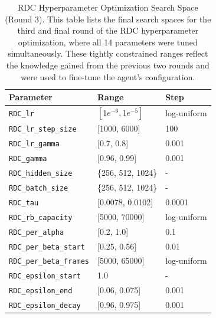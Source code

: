 \begin{table}[!htb]
    \centering
    \begin{tabular}{lll}
        \toprule
        \textbf{Parameter} & \textbf{Range} & \textbf{Step} \\
        \midrule
        \texttt{RDC\_lr}                 & $[1e^{-6}, 1e^{-5}]$      & log-uniform \\
        \texttt{RDC\_lr\_step\_size}     & [1000, 6000]               & 100 \\
        \texttt{RDC\_lr\_gamma}          & [0.7, 0.8]              & 0.001 \\
        \texttt{RDC\_gamma}              & [0.96, 0.99]              & 0.001\\
        \midrule
        \texttt{RDC\_hidden\_size}       & \{256, 512, 1024\}                 & - \\
        \texttt{RDC\_batch\_size}        & \{256, 512, 1024\}          & - \\
        \texttt{RDC\_tau}                & [0.0078, 0.0102]           & 0.0001 \\
        \midrule
        \texttt{RDC\_rb\_capacity}       & [5000, 70000]             & log-uniform\\
        \texttt{RDC\_per\_alpha}         & [0.2, 1.0]              & 0.1\\
        \texttt{RDC\_per\_beta\_start}   & [0.25, 0.56]              & 0.01\\
        \texttt{RDC\_per\_beta\_frames}  & [5000, 65000]           & log-uniform\\
        \midrule
        \texttt{RDC\_epsilon\_start}     & 1.0                       & - \\
        \texttt{RDC\_epsilon\_end}       & [0.06, 0.075]              & 0.001 \\
        \texttt{RDC\_epsilon\_decay}     & [0.96, 0.975]            & 0.001\\
        \midrule
    \end{tabular}
    \caption{RDC Hyperparameter Optimization Search Space (Round 3). This table lists the final search spaces for the third and final round of the RDC hyperparameter optimization, where all 14 parameters were tuned simultaneously. These tightly constrained ranges reflect the knowledge gained from the previous two rounds and were used to fine-tune the agent's configuration.}
    \label{tab:rdc_ho_final_round}
\end{table}


